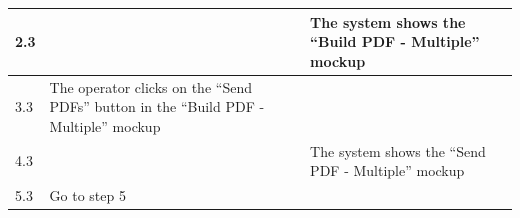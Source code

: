 {{{\begin{table}[h]
\begin{tabular}{|p{2cm}|p{6cm}|p{6cm}|}
			\hline
				\vspace{1mm} 2.3\vspace{1mm} &
				\vspace{1mm} \vspace{1mm} & 
				\vspace{1mm} The system shows the “Build PDF - Multiple” mockup \vspace{1mm} \\
			\hline
				\vspace{1mm} 3.3\vspace{1mm} &
				\vspace{1mm} The operator clicks on the “Send PDFs” button in the “Build PDF - Multiple” mockup \vspace{1mm} & 
				\vspace{1mm} \vspace{1mm} \\
			\hline
				\vspace{1mm} 4.3\vspace{1mm} &
				\vspace{1mm} \vspace{1mm} & 
				\vspace{1mm} The system shows the “Send PDF - Multiple” mockup\vspace{1mm} \\
			\hline
				\vspace{1mm} 5.3\vspace{1mm} &
				\vspace{1mm} Go to step 5\vspace{1mm} & 
				\vspace{1mm} \vspace{1mm} \\
			\hline
			\end{tabular}
			\end{table}
			
			\clearpage
	
}}}
